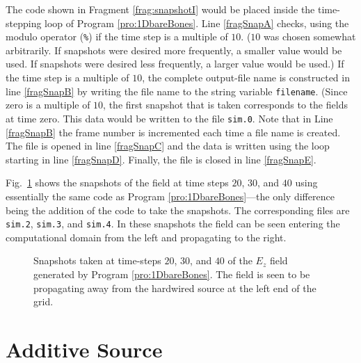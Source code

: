 The code shown in Fragment \ref{frag:snapshotI} would be placed inside
the time-stepping loop of Program \ref{pro:1DbareBones}.  Line
\ref{fragSnapA} checks, using the modulo operator ({\tt \%}) if the
time step is a multiple of $10$.  ($10$ was chosen somewhat
arbitrarily.  If snapshots were desired more frequently, a smaller
value would be used.  If snapshots were desired less frequently, a
larger value would be used.)  If the time step is a multiple of $10$,
the complete output-file name is constructed in line \ref{fragSnapB}
by writing the file name to the string variable {\tt filename}.
(Since zero is a multiple of $10$, the first snapshot that is taken
corresponds to the fields at time zero.  This data would be written to
the file {\tt sim.0}.  Note that in Line \ref{fragSnapB} the frame
number is incremented each time a file name is created.  The file is
opened in line \ref{fragSnapC} and the data is written using the loop
starting in line \ref{fragSnapD}.  Finally, the file is closed in line
\ref{fragSnapE}.

Fig.\ \ref{fig:snapshots} shows the snapshots of the field at time
steps $20$, $30$, and $40$ using essentially the same code as Program
\ref{pro:1DbareBones}---the only difference being the addition of the
code to take the snapshots.  The corresponding files are {\tt sim.2},
{\tt sim.3}, and {\tt sim.4}.  In these snapshots the field can be
seen entering the computational domain from the left and propagating
to the right.

\begin{figure}
  \begin{center}
\end{center} \caption{Snapshots taken at time-steps $20$, $30$, and
  $40$ of the $E_z$ field generated by Program \ref{pro:1DbareBones}.
  The field is seen to be propagating away from the hardwired source
  at the left end of the grid.}  \label{fig:snapshots}
\end{figure}

\section{Additive Source \label{sec:additive}}

